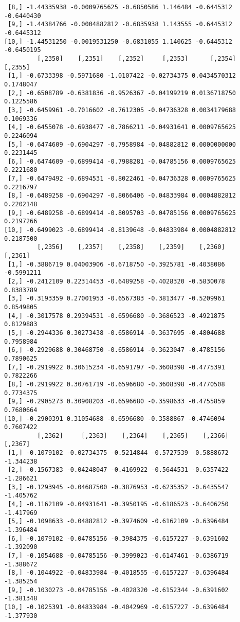 \documentclass[
  letterpaper,
  DIV=11,
  numbers=noendperiod]{scrreprt}
\begin{document}
\begin{verbatim}
 [8,] -1.44335938 -0.0009765625 -0.6850586 1.146484 -0.6445312 -0.6440430
 [9,] -1.44384766 -0.0004882812 -0.6835938 1.143555 -0.6445312 -0.6445312
[10,] -1.44531250 -0.0019531250 -0.6831055 1.140625 -0.6445312 -0.6450195
         [,2350]    [,2351]    [,2352]     [,2353]      [,2354]   [,2355]
 [1,] -0.6733398 -0.5971680 -1.0107422 -0.02734375 0.0434570312 0.1748047
 [2,] -0.6508789 -0.6381836 -0.9526367 -0.04199219 0.0136718750 0.1225586
 [3,] -0.6459961 -0.7016602 -0.7612305 -0.04736328 0.0034179688 0.1069336
 [4,] -0.6455078 -0.6938477 -0.7866211 -0.04931641 0.0009765625 0.2246094
 [5,] -0.6474609 -0.6904297 -0.7958984 -0.04882812 0.0000000000 0.2231445
 [6,] -0.6474609 -0.6899414 -0.7988281 -0.04785156 0.0009765625 0.2221680
 [7,] -0.6479492 -0.6894531 -0.8022461 -0.04736328 0.0009765625 0.2216797
 [8,] -0.6489258 -0.6904297 -0.8066406 -0.04833984 0.0004882812 0.2202148
 [9,] -0.6489258 -0.6899414 -0.8095703 -0.04785156 0.0009765625 0.2197266
[10,] -0.6499023 -0.6899414 -0.8139648 -0.04833984 0.0004882812 0.2187500
         [,2356]    [,2357]    [,2358]    [,2359]    [,2360]    [,2361]
 [1,] -0.3886719 0.04003906 -0.6718750 -0.3925781 -0.4038086 -0.5991211
 [2,] -0.2412109 0.22314453 -0.6489258 -0.4028320 -0.5830078  0.8383789
 [3,] -0.3193359 0.27001953 -0.6567383 -0.3813477 -0.5209961  0.8549805
 [4,] -0.3017578 0.29394531 -0.6596680 -0.3686523 -0.4921875  0.8129883
 [5,] -0.2944336 0.30273438 -0.6586914 -0.3637695 -0.4804688  0.7958984
 [6,] -0.2929688 0.30468750 -0.6586914 -0.3623047 -0.4785156  0.7890625
 [7,] -0.2919922 0.30615234 -0.6591797 -0.3608398 -0.4775391  0.7822266
 [8,] -0.2919922 0.30761719 -0.6596680 -0.3608398 -0.4770508  0.7734375
 [9,] -0.2905273 0.30908203 -0.6596680 -0.3598633 -0.4755859  0.7680664
[10,] -0.2900391 0.31054688 -0.6596680 -0.3588867 -0.4746094  0.7607422
         [,2362]     [,2363]    [,2364]    [,2365]    [,2366]   [,2367]
 [1,] -0.1079102 -0.02734375 -0.5214844 -0.5727539 -0.5888672 -1.344238
 [2,] -0.1567383 -0.04248047 -0.4169922 -0.5644531 -0.6357422 -1.286621
 [3,] -0.1293945 -0.04687500 -0.3876953 -0.6235352 -0.6435547 -1.405762
 [4,] -0.1162109 -0.04931641 -0.3950195 -0.6186523 -0.6406250 -1.417969
 [5,] -0.1098633 -0.04882812 -0.3974609 -0.6162109 -0.6396484 -1.396484
 [6,] -0.1079102 -0.04785156 -0.3984375 -0.6157227 -0.6391602 -1.392090
 [7,] -0.1054688 -0.04785156 -0.3999023 -0.6147461 -0.6386719 -1.388672
 [8,] -0.1044922 -0.04833984 -0.4018555 -0.6157227 -0.6396484 -1.385254
 [9,] -0.1030273 -0.04785156 -0.4028320 -0.6152344 -0.6391602 -1.381348
[10,] -0.1025391 -0.04833984 -0.4042969 -0.6157227 -0.6396484 -1.377930

\end{verbatim}
\end{document}
